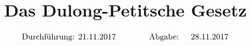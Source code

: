 

\subject{v201}
\title{Das Dulong-Petitsche Gesetz}

\date{%
\begin{align}
& \text{Durchführung: 21.11.2017} & \hspace{3em} & \text{Abgabe: } & {28.11.2017} \notag 
\end{align}
}



\maketitle
\thispagestyle{empty}
\tableofcontents
\newpage






\nocite{*}
\printbibliography{}


